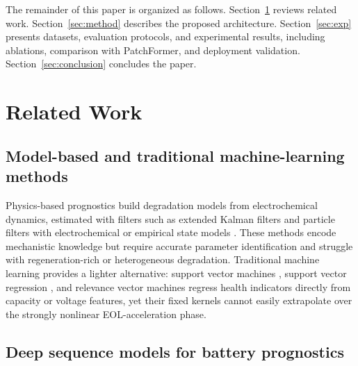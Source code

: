 \documentclass[final,5p,times,twocolumn]{elsarticle}
\begin{document}
The remainder of this paper is organized as follows.
Section~\ref{sec:related} reviews related work.
Section~\ref{sec:method} describes the proposed architecture.
Section~\ref{sec:exp} presents datasets, evaluation protocols, and
experimental results, including ablations, comparison with
PatchFormer, and deployment validation.
Section~\ref{sec:conclusion} concludes the paper.

\section{Related Work}
\label{sec:related}

\subsection{Model-based and traditional machine-learning methods}

Physics-based prognostics build degradation models from electrochemical
dynamics, estimated with filters such as extended Kalman filters
\cite{ref_ekf_yan} and particle filters with electrochemical or empirical state models
\cite{ref_pf_echem,ref_pf_rbf,ref_pf_lui}. These methods encode
mechanistic knowledge but require accurate parameter identification
and struggle with regeneration-rich or heterogeneous degradation.
Traditional machine learning provides a lighter alternative:
support vector machines \cite{ref_svm_klass,ref_svm_patil}, support
vector regression \cite{ref_svr_wang}, and relevance vector machines
\cite{ref_rvm_guo} regress health indicators directly from capacity
or voltage features, yet their fixed kernels cannot easily extrapolate
over the strongly nonlinear EOL-acceleration phase.

\subsection{Deep sequence models for battery prognostics}
\end{document}
